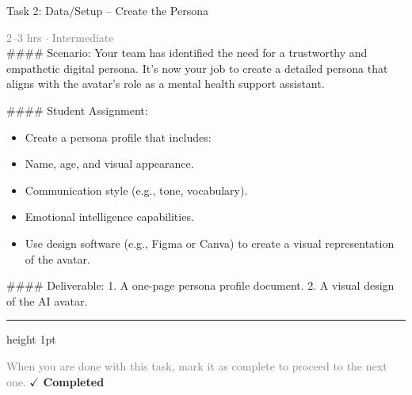 \documentclass[10pt,a4paper]{article}
\begin{document}
\begin{taskbox}{Task 2: Data/Setup – Create the Persona}

    {\small \textcolor{gray}{2--3 hrs $\cdot$ Intermediate}}\\[12pt]

    \#\#\#\# Scenario:  
Your team has identified the need for a trustworthy and empathetic digital persona. It’s now your job to create a detailed persona that aligns with the avatar’s role as a mental health support assistant.  

\#\#\#\# Student Assignment:  
\begin{itemize}
    \item Create a persona profile that includes:  
    \item Name, age, and visual appearance.  
    \item Communication style (e.g., tone, vocabulary).  
    \item Emotional intelligence capabilities.  
    \item Use design software (e.g., Figma or Canva) to create a visual representation of the avatar.  
\end{itemize}

\#\#\#\# Deliverable:  
1. A one-page persona profile document.  
2. A visual design of the AI avatar.\par

    \vspace{16pt}

    \textcolor{cardBorder}{\hrule height 1pt}\vspace{8pt}

    \small \textcolor{gray}{When you are done with this task, mark it as complete to proceed to the next one.} \hfill \textbf{\textcolor{brandDark}{$\checkmark$ Completed}}

\end{taskbox}
\end{document}
